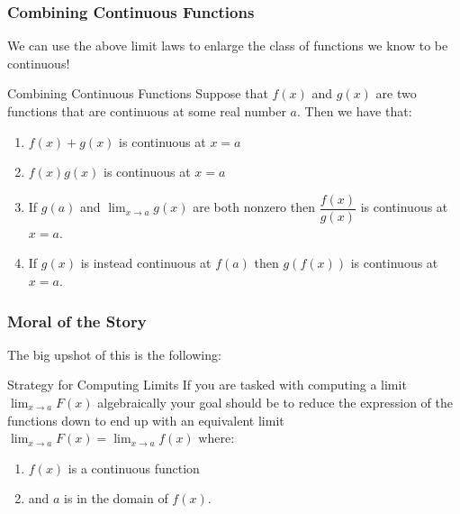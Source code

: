 \documentclass{ltx-talk}
\begin{document}
\begin{frame}
  \frametitle{Combining Continuous Functions}

  We can use the above limit laws to enlarge the class of functions we know to be continuous! \pause

  \begin{alertblock}{Combining Continuous Functions}
    Suppose that $f(x)$ and $g(x)$ are two functions that are continuous at some real number $a$. \pause
    Then we have that: \pause
    \begin{enumerate}
      \item $f(x) + g(x)$ is continuous at $x = a$ \pause
      \item $f(x)g(x)$ is continuous at $x = a$ \pause
      \item If $g(a)$ and $\lim_{x \rightarrow a} g(x)$ are both nonzero then $\dfrac{f(x)}{g(x)}$ is continuous at $x = a$. \pause
      \item If $g(x)$ is instead continuous at $f(a)$ then $g(f(x))$ is continuous at $x = a$.
    \end{enumerate}
  \end{alertblock}
\end{frame}

\begin{frame}
  \frametitle{Moral of the Story}

  The big upshot of this is the following:

  \begin{alertblock}{Strategy for Computing Limits}
    If you are tasked with computing a limit $\lim_{x \rightarrow a} F(x)$ algebraically \pause
    your goal should be to reduce the expression of the functions down \pause
    to end up with an equivalent limit $\lim_{x \rightarrow a} F(x) = \lim_{x \rightarrow a} f(x)$
    where: \pause
    \begin{enumerate}
      \item $f(x)$ is a continuous function \pause
      \item and $a$ is in the domain of $f(x)$.
    \end{enumerate}
  \end{alertblock}
\end{frame}
\end{document}
